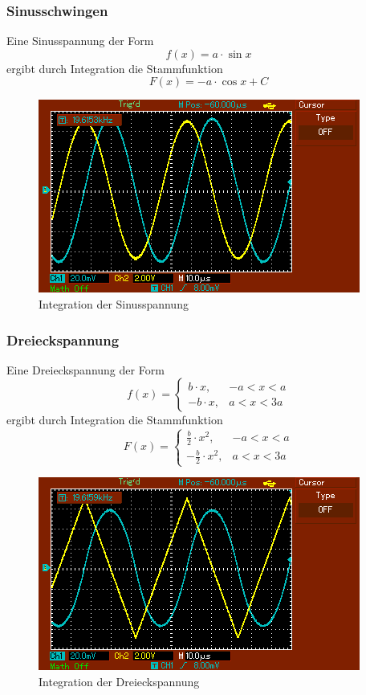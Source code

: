\subsubsection{Sinusschwingen}
Eine Sinusspannung der Form
\begin{equation*}
  f(x) = a\cdot \sin{x}
\end{equation*}
ergibt durch Integration die Stammfunktion
\begin{equation*}
  F(x) = -a\cdot \cos{x} + C
\end{equation*}
\begin{figure}[H]
  \centering
  \includegraphics{sinus.png}
  \caption{Integration der Sinusspannung}
  \label{fig:sinus}
\end{figure}
\subsubsection{Dreieckspannung}
Eine Dreieckspannung der Form
\begin{equation*}
  f(x) = \begin{cases}
         b \cdot x  , & -a < x < a \\
         -b \cdot x  , & a < x < 3a
       \end{cases}
\end{equation*}
ergibt durch Integration die Stammfunktion
\begin{equation*}
  F(x) = \begin{cases}
         \frac{b}{2} \cdot x^2  , & -a < x < a \\
         -\frac{b}{2} \cdot x^2  , & a < x < 3a
       \end{cases}
\end{equation*}
\begin{figure}[H]
  \centering
  \includegraphics{Dreieck.png}
  \caption{Integration der Dreieckspannung}
  \label{fig:dreieck}
\end{figure}
